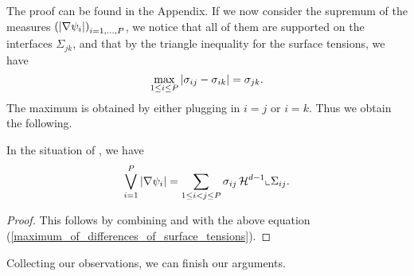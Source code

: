 The proof can be found in the Appendix. If we now consider the supremum of the 
measures $ \left( \abs{ \nabla \psi_{ i } } \right)_{ i = 1 , \dotsc, P } $, we 
notice that all of them are supported on the interfaces $ \Sigma_{ j k } $, and 
that by the triangle inequality for the surface tensions, we have 
\begin{equation}
	\label{maximum_of_differences_of_surface_tensions}
	\max_{ 1 \leq i \leq P }
		\abs{ \sigma_{ i j } - \sigma_{ i k } }
	=
	\sigma_{ j k }.
\end{equation}
The maximum is obtained by either plugging in $ i = j $ or $ i = k $. Thus we 
obtain the following.

\begin{proposition}
	\label{supremum_of_abs_nabla_psi_i_is_energy}
	In the situation of , we have
	\begin{equation*}
			\bigvee_{ i = 1 }^{ P }
			\abs{ \nabla \psi_{ i } }
		=
		\sum_{ 1 \leq i < j \leq P }
		 \sigma_{ i j }
		 \operatorname{\mathcal{H}}^{ d - 1 } \llcorner{ \Sigma_{ i j } } .
	\end{equation*}
\end{proposition}

\begin{proof}
	This follows by combining  and  with the above equation (\ref{maximum_of_differences_of_surface_tensions}).
\end{proof}

Collecting our observations, we can finish our arguments.

